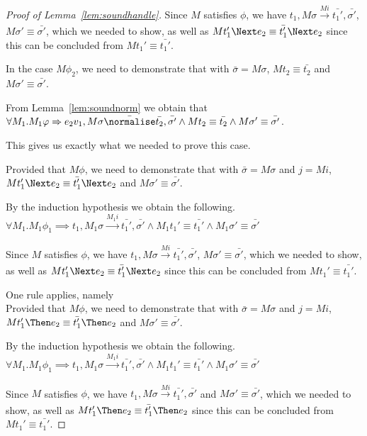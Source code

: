 \begin{proof}[Proof of Lemma~\ref{lem:soundhandle}]
{{  Since $M$ satisfies $\phi$, we have $t_1,M\sigma \xrightarrow[]{M i} \bar{t_1'},\bar{\sigma'}$, $M\sigma'\equiv\bar{\sigma'}$,
  which we needed to show, as well as $M t_1' \Next e_2 \equiv \bar{t_1'}\Next e_2$ since this can be concluded from $M t_1'\equiv \bar{t_1'}$.

  In the case $M\phi_2$, we need to demonstrate that  with $\bar{\sigma}=M\sigma$,
  $M t_2 \equiv \bar{t_2}$ and $M\sigma'\equiv\bar{\sigma'}$.

  From Lemma~\ref{lem:soundnorm} we obtain that $\forall M_1. M_1 \phi \implies e_2 v_1,M\sigma\bar{\normalise}\bar{t_2},\bar{\sigma'}\land M t_2\equiv\bar{t_2}\land M \sigma'\equiv\bar{\sigma'}$.

  This gives us exactly what we needed to prove this case.
    }

  {
  Provided that $M\phi$, we need to demonstrate that  with $\bar{\sigma}=M\sigma$ and $j= M i$,
  $M t_1' \Next e_2 \equiv \bar{t_1'}\Next e_2$ and $M\sigma'\equiv\bar{\sigma'}$.

  By the induction hypothesis we obtain the following.\\
  $\forall M_1 . M_1 \phi_1 \implies t_1,M_1\sigma \xrightarrow[]{M_1 i} \bar{t_1'},\bar{\sigma'}\land M_1 t_1'\equiv\bar{t_1'}\land M_1\sigma' \equiv \bar{\sigma'}$

  Since $M$ satisfies $\phi$, we have $t_1,M\sigma \xrightarrow[]{M i} \bar{t_1'},\bar{\sigma'}$, $M\sigma'\equiv\bar{\sigma'}$,
  which we needed to show, as well as $M t_1' \Next e_2 \equiv \bar{t_1'}\Next e_2$ since this can be concluded from $M t_1'\equiv \bar{t_1'}$.
  }
  }

  {One rule applies, namely \\
  Provided that $M\phi$, we need to demonstrate that  with $\bar{\sigma}=M\sigma$ and $j= M i$,
  $M t_1'\Then e_2\equiv \bar{t_1'}\Then e_2$ and $M\sigma'\equiv\bar{\sigma'}$.

  By the induction hypothesis we obtain the following.\\
  $\forall M_1 . M_1 \phi_1 \implies t_1,M_1\sigma \xrightarrow[]{M_1 i} \bar{t_1'},\bar{\sigma'}\land M_1 t_1'\equiv\bar{t_1'}\land M_1\sigma' \equiv \bar{\sigma'}$

  Since $M$ satisfies $\phi$, we have $t_1,M\sigma \xrightarrow[]{M i} \bar{t_1'},\bar{\sigma'}$ and $M\sigma'\equiv\bar{\sigma'}$,
  which we needed to show, as well as $M t_1' \Then e_2 \equiv \bar{t_1'}\Then e_2$ since this can be concluded from $M t_1'\equiv \bar{t_1'}$.

}
\end{proof}
